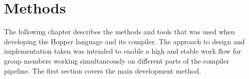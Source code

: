 \chapter{Methods}



The following chapter describes the methods and tools that was used when developing the Hopper language and its compiler. The approach to design and implementation taken was intended to enable a high and stable work flow for group members working simultaneously on different parts of the compiler pipeline. The first section covers the main development method.





